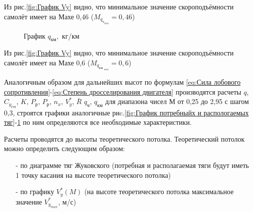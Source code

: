 Из рис.\ref{fig:График Vy} видно, что минимальное значение скороподъёмности самолёт имеет на Махе 0,46 ($M_{q_{\text{ч}_{min}}} = 0,46$)

\begin{figure}[H]
    \caption{График $q_\text{км}, $ кг/км}
    \label{fig:График qkm}
\end{figure}

Из рис.\ref{fig:График Vy} видно, что минимальное значение скороподъёмности самолёт имеет на Махе 0,6 ($M_{q_{\text{км }_{min}}} = 0,6$)

Аналогичным образом для дальнейших высот по формулам \ref{eq:Сила лобового сопротивления}-\ref{eq:Степень дросселирования двигателя} производятся расчеты $q$, $C_{y_\text{ГП}}$, $K$, $P_\text{р}$, $P_\text{р}$, $n_x$, $V_y^*$, $\bar{R}$ $q_\text{ч}$, $q_\text{км}$ для диапазона чисел М от 0,25 до 2,95 с шагом 0,3, строятся графики аналогичные риc.\ref{fig:График потребныйх и распологаемых тяг}-\ref{fig:График qkm} по ним определяются все
необходимые характеристики. 

Расчеты проводятся до высоты теоретического потолка. Теоретический
потолок можно определить следующим образом: 

\begin{enumerate}
\item [-] по диаграмме тяг Жуковского (потребная и располагаемая тяги будут иметь 1
точку касания на высоте теоретического потолка) 
    \item [-] по графику $V_y^*(M)$ (на высоте теоретического потолка максимальное значение $V^*_{y_{max}}$, м/с) 
 \end{enumerate}
 
